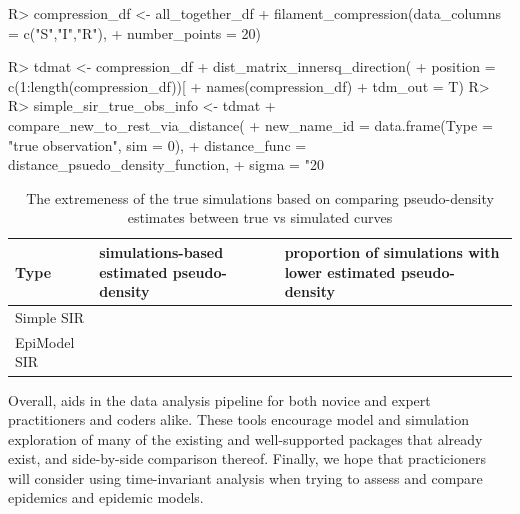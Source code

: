 \documentclass[
  shortnames]{jss}
\begin{document}
\begin{CodeChunk}
\begin{CodeInput}
R> compression_df <- all_together_df %
+   filament_compression(data_columns = c("S","I","R"), 
+                        number_points = 20)
\end{CodeInput}
\end{CodeChunk}

\begin{CodeChunk}
\begin{CodeInput}
R> tdmat <- compression_df %
+   dist_matrix_innersq_direction(
+     position = c(1:length(compression_df))[
+       names(compression_df) %
+     tdm_out = T)
R> 
R> simple_sir_true_obs_info <- tdmat %
+   compare_new_to_rest_via_distance(
+     new_name_id = data.frame(Type = "true observation", sim = 0),
+     distance_func = distance_psuedo_density_function, 
+     sigma = "20%
\end{CodeInput}
\end{CodeChunk}

\begin{CodeChunk}
\begin{table}[!h]

\caption{\label{tab:hags-extreme}The extremeness of the true simulations based on comparing pseudo-density estimates between true vs simulated curves}
\centering
\begin{tabular}[t]{l>{\raggedleft\arraybackslash}p{6cm}>{\raggedleft\arraybackslash}p{6cm}}
\toprule
Type & simulations-based estimated pseudo-density & proportion of simulations with lower estimated pseudo-density\\
\midrule
Simple SIR & 0.0036733 & 0.00\\
EpiModel SIR & 0.0149686 & 0.02\\
\bottomrule
\end{tabular}
\end{table}

\end{CodeChunk}

Overall,  aids in the data analysis pipeline for both
novice and expert practitioners and coders alike. These tools encourage
model and simulation exploration of many of the existing and
well-supported packages that already exist, and side-by-side comparison
thereof. Finally, we hope that practicioners will consider using
time-invariant analysis when trying to assess and compare epidemics and
epidemic models.
\end{document}
